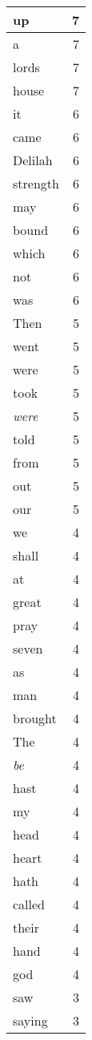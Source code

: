 \begin{center}
\begin{longtable}{l|r}
up & 7\\ \hline 
a & 7\\ \hline 
lords & 7\\ \hline 
house & 7\\ \hline 
it & 6\\ \hline 
came & 6\\ \hline 
Delilah & 6\\ \hline 
strength & 6\\ \hline 
may & 6\\ \hline 
bound & 6\\ \hline 
which & 6\\ \hline 
not & 6\\ \hline 
was & 6\\ \hline 
Then & 5\\ \hline 
went & 5\\ \hline 
were & 5\\ \hline 
took & 5\\ \hline 
\emph{were} & 5\\ \hline 
told & 5\\ \hline 
from & 5\\ \hline 
out & 5\\ \hline 
our & 5\\ \hline 
we & 4\\ \hline 
shall & 4\\ \hline 
at & 4\\ \hline 
great & 4\\ \hline 
pray & 4\\ \hline 
seven & 4\\ \hline 
as & 4\\ \hline 
man & 4\\ \hline 
brought & 4\\ \hline 
The & 4\\ \hline 
\emph{be} & 4\\ \hline 
hast & 4\\ \hline 
my & 4\\ \hline 
head & 4\\ \hline 
heart & 4\\ \hline 
hath & 4\\ \hline 
called & 4\\ \hline 
their & 4\\ \hline 
hand & 4\\ \hline 
god & 4\\ \hline 
saw & 3\\ \hline 
saying & 3\\ \hline 

\end{longtable}
\end{center}
